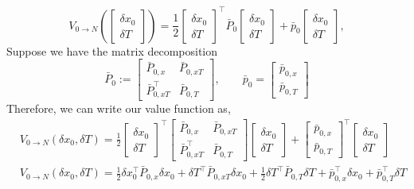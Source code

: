\documentclass{article}
\begin{document}
\begin{equation}
    V_{0 \rightarrow N} \left(\begin{bmatrix}
        \delta x_0 \\
        \delta T
    \end{bmatrix}\right) = \frac{1}{2} \begin{bmatrix}
        \delta x_0 \\
        \delta T
    \end{bmatrix} ^\top \bar P_0 \begin{bmatrix}
        \delta x_0 \\
        \delta T
    \end{bmatrix} + \bar p_0 \begin{bmatrix}
        \delta x_0 \\
        \delta T
    \end{bmatrix},
\end{equation}
Suppose we have the matrix decomposition
\begin{equation}
    \bar P_0 := \begin{bmatrix}
        \bar P_{0,x} & \bar P_{0,xT} \\
        \bar P_{0, xT}^\top & \bar P_{0,T}
    \end{bmatrix},
    \qquad 
    \bar p_0 = \begin{bmatrix}
        \bar p_{0, x} \\
        \bar p_{0,T}
    \end{bmatrix}
\end{equation}
Therefore, we can write our value function as,
\begin{equation}
    \begin{aligned}
        & V_{0 \rightarrow N}(\delta x_0, \delta T) = \frac{1}{2} \begin{bmatrix}
            \delta x_0 \\
            \delta T
        \end{bmatrix}^\top 
        \begin{bmatrix}
            \bar P_{0,x} & \bar P_{0,xT} \\
            \bar P_{0, xT}^\top & \bar P_{0,T}
        \end{bmatrix}
        \begin{bmatrix}
            \delta x_0 \\
            \delta T
        \end{bmatrix}
        +
        \begin{bmatrix}
            \bar p_{0, x} \\
            \bar p_{0,T}
        \end{bmatrix}^\top \begin{bmatrix}
            \delta x_0 \\
            \delta T
        \end{bmatrix} \\
        & V_{0 \rightarrow N} (\delta x_0, \delta T) = \frac{1}{2} \delta x_0^\top \bar P_{0,x} \delta x_0
        +
        \delta T^\top \bar P_{0, xT} \delta x_0 + \frac{1}{2} \delta T^\top \bar P_{0, T} \delta T + \bar p _{0,x}^\top \delta x_0 + \bar p_{0, T}^\top \delta T
    \end{aligned}
\end{equation}
\end{document}
